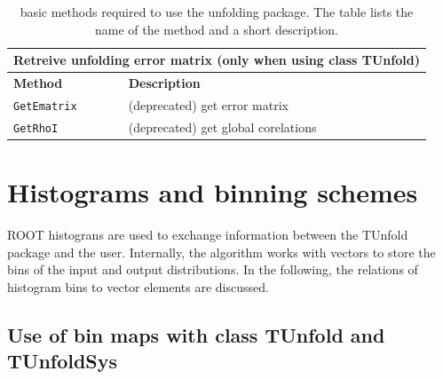 \documentclass[12pt]{article}
\begin{document}
\begin{table}[ht]
\begin{tabular}{l|p{}}
 \\
\hline
\hline
\multicolumn{2}{c}{Retreive unfolding error matrix (only when using class TUnfold)}\\
\hline
{\bf Method} & {\bf Description}
 \\
\hline
{\tt GetEmatrix} & (deprecated) get error matrix 
 \\
{\tt GetRhoI} & (deprecated) get global corelations
 \\
\hline
\end{tabular}
\caption{\label{tab:mainmethods}basic methods required to use the
  unfolding package. The table lists the name of the method and a short
  description.}
\end{table}

\section{Histograms and binning schemes}

ROOT histograns are used to exchange information between the TUnfold
package and the user. Internally, the algorithm works with vectors to
store the bins of the input and output distributions. In the
following, the relations of histogram bins to vector elements are discussed.

\subsection{Use of  bin maps with class TUnfold and TUnfoldSys}
\end{document}
